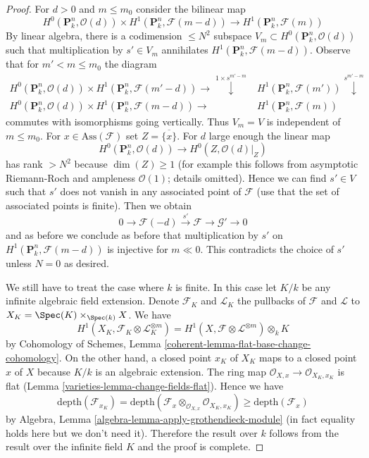 \begin{proof}
\medskip\noindent
For $d > 0$ and $m \leq m_0$ consider the bilinear map
$$
H^0(\mathbf{P}^n_k, \mathcal{O}(d)) \times
H^1(\mathbf{P}^n_k, \mathcal{F}(m - d))
\longrightarrow
H^1(\mathbf{P}^n_k, \mathcal{F}(m))
$$
By linear algebra, there is a codimension $\leq N^2$ subspace
$V_m \subset H^0(\mathbf{P}^n_k, \mathcal{O}(d))$ such that
multiplication by $s' \in V_m$ annihilates
$H^1(\mathbf{P}^n_k, \mathcal{F}(m - d))$.
Observe that for $m' < m \leq m_0$ the diagram
$$
\begin{array}{cc}H^0(\mathbf{P}^n_k, \mathcal{O}(d)) \times
H^1(\mathbf{P}^n_k, \mathcal{F}(m' - d)) \longrightarrow\overset{1 \times s^{m' - m}}{\downarrow} & H^1(\mathbf{P}^n_k, \mathcal{F}(m')) \overset{s^{m' - m}}{\downarrow} \\ H^0(\mathbf{P}^n_k, \mathcal{O}(d)) \times
H^1(\mathbf{P}^n_k, \mathcal{F}(m - d)) \longrightarrow & H^1(\mathbf{P}^n_k, \mathcal{F}(m))\end{array}
$$
commutes with isomorphisms going vertically. Thus $V_m = V$ is
independent of $m \leq m_0$. For $x \in \text{Ass}(\mathcal{F})$
set $Z = \overline{\{x\}}$. For $d$ large enough the linear map
$$
H^0(\mathbf{P}^n_k, \mathcal{O}(d)) \to H^0(Z, \mathcal{O}(d)|_Z)
$$
has rank $> N^2$ because $\dim(Z) \geq 1$ (for example this follows
from asymptotic Riemann-Roch and ampleness $\mathcal{O}(1)$; details
omitted). Hence we can find $s' \in V$ such that $s'$ does not vanish
in any associated point of $\mathcal{F}$ (use that the set
of associated points is finite). Then we obtain
$$
0 \to \mathcal{F}(-d) \xrightarrow{s'} \mathcal{F} \to \mathcal{G}' \to 0
$$
and as before we conclude as before that multiplication by $s'$
on $H^1(\mathbf{P}^n_k, \mathcal{F}(m - d))$ is injective
for $m \ll 0$. This contradicts the choice of $s'$ unless
$N = 0$ as desired.

\medskip\noindent
We still have to treat the case where $k$ is finite.
In this case let $K/k$ be any infinite algebraic field extension.
Denote $\mathcal{F}_K$ and $\mathcal{L}_K$ the pullbacks
of $\mathcal{F}$ and $\mathcal{L}$ to $X_K = \Spec(K) \times_{\Spec(k)} X$.
We have
$$
H^1(X_K, \mathcal{F}_K \otimes \mathcal{L}_K^{\otimes m}) =
H^1(X, \mathcal{F} \otimes \mathcal{L}^{\otimes m}) \otimes_k K
$$
by Cohomology of Schemes, Lemma
\ref{coherent-lemma-flat-base-change-cohomology}.
On the other hand, a closed point $x_K$ of $X_K$ maps to a closed point
$x$ of $X$ because $K/k$ is an algebraic extension. The
ring map $\mathcal{O}_{X, x} \to \mathcal{O}_{X_K, x_K}$
is flat (Lemma \ref{varieties-lemma-change-fields-flat}). Hence we have
$$
\text{depth}(\mathcal{F}_{x_K}) =
\text{depth}(\mathcal{F}_x \otimes_{\mathcal{O}_{X, x}}
\mathcal{O}_{X_K, x_K}) \geq
\text{depth}(\mathcal{F}_x)
$$
by Algebra, Lemma \ref{algebra-lemma-apply-grothendieck-module}
(in fact equality holds here but we don't need it).
Therefore the result over $k$ follows
from the result over the infinite field $K$ and the proof is complete.
\end{proof}

